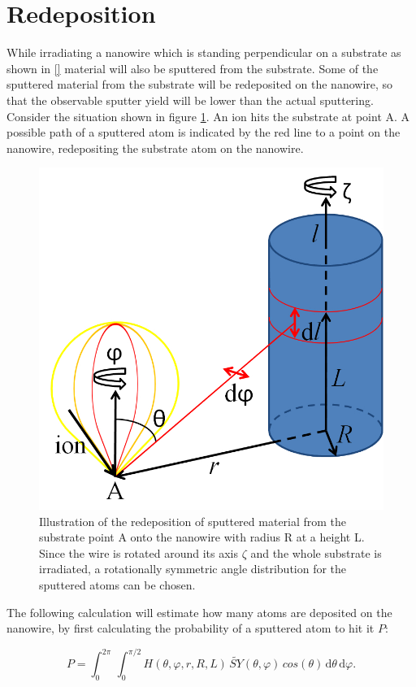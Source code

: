 \section{Redeposition}
\label{sec:redeposition}

While irradiating a nanowire which is standing perpendicular on a substrate as shown in \ref{} material will also be sputtered from the substrate. Some of the sputtered material from the substrate will be redeposited on the nanowire, so that the observable sputter yield will be lower than the actual sputtering. Consider the situation shown in figure \ref{redeposit}. An ion hits the substrate at point A. A possible path of a sputtered atom is indicated by the red line to a point on the nanowire, redepositing the substrate atom on the nanowire. 

\begin{figure}
	\centering
		\includegraphics[width=.4\textwidth]{images/redeposit.jpg}
	\caption{Illustration of the redeposition of sputtered material from the substrate point A onto the nanowire with radius R at a height L. Since the wire is rotated around its axis $\zeta$ and the whole substrate is irradiated, a rotationally symmetric angle distribution for the sputtered atoms can be chosen.} 
	\label{redeposit}
\end{figure}

The following calculation will estimate how many atoms are deposited on the nanowire, by first calculating the probability of a sputtered atom to hit it $P$:

\begin{equation}
\label{prob1}
P = \int_0^{2\pi} \! \,\int_0^{\pi/2} \!\! H(\theta,\varphi,r,R,L) \, \tilde{SY}(\theta,\varphi) \,cos(\theta)\,\mathrm{d}\theta \, \mathrm{d}\varphi.
\end{equation}

